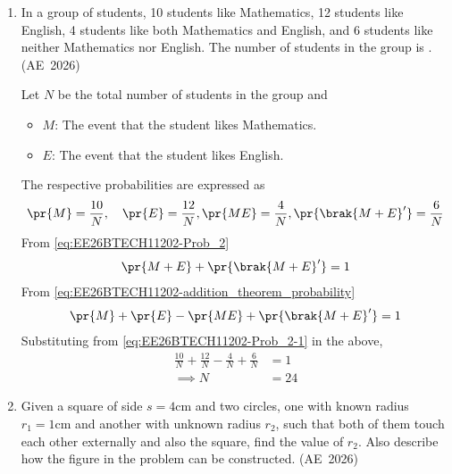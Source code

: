 \begin{enumerate}[label=\thesubsection.\arabic*, ref=\thesubsection.\theenumi]
\item
In a group of students, 10 students like Mathematics, 12 students like English, 4 students like both Mathematics and English, and 6 students like neither Mathematics nor English. The number of students in the group is \underline{\hspace{1cm}}.
\hfill (AE~2026)
\begin{enumerate}
	\begin{multicols}{4}
    \item $18$
    \item $20$
    \item $24$
    \item $32$
	\end{multicols}
\end{enumerate} 
\solution 
Let $N$ be the total number of students in the group and
\begin{itemize}
    \item $M$: The event that the student likes Mathematics.
    \item $E$: The event that the student likes English.
\end{itemize}
The respective probabilities are expressed as
\begin{align}
\pr{M} = \frac{10}{N}, \quad \pr{E} = \frac{12}{N},
\pr{ME} = \frac{4}{N},
\pr{\brak{M+E}^{\prime}} = \frac{6}{N} 
\label{eq:EE26BTECH11202-Prob_2-1}
\end{align}
From \eqref{eq:EE26BTECH11202-Prob_2}
\begin{align}
\pr{M + E} + \pr{\brak{M+E}^{\prime}} = 1
\end{align}
From \eqref{eq:EE26BTECH11202-addition_theorem_probability}
\begin{align}
\pr{M} + \pr{E} - \pr{ME} + \pr{\brak{M+E}^{\prime}} = 1
\end{align}
Substituting from 
\eqref{eq:EE26BTECH11202-Prob_2-1}
in 
the above, 
\begin{align}
	\frac{10}{N} + \frac{12}{N} - \frac{4}{N} + \frac{6}{N} &= 1
\\
	\implies N &= 24
\end{align}
\item 
Given a square of side $s=4\text{cm}$ and two circles, one with known radius $r_1=1\text{cm}$ and another with unknown radius $r_2$, such that both of them touch each other externally and also the square, find the value of $r_2$. Also describe how the figure in the problem can be constructed. \hfill (AE~2026)
\begin{figure}[H]

\end{figure}
\end{enumerate}
